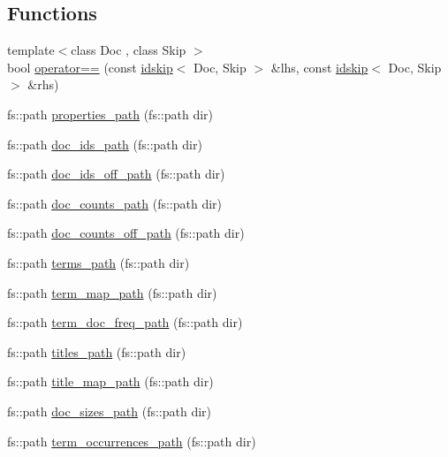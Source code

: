 \subsection*{Functions}
\begin{DoxyCompactItemize}
\item 
{\footnotesize template$<$class Doc , class Skip $>$ }\\bool \mbox{\hyperlink{namespaceirk_1_1index_abd8c6907b919343282e10fd76dec4dba}{operator==}} (const \mbox{\hyperlink{structirk_1_1index_1_1idskip}{idskip}}$<$ Doc, Skip $>$ \&lhs, const \mbox{\hyperlink{structirk_1_1index_1_1idskip}{idskip}}$<$ Doc, Skip $>$ \&rhs)
\item 
fs\+::path \mbox{\hyperlink{namespaceirk_1_1index_a5880f03dd72d6ebbae004d2ab83c219e}{properties\+\_\+path}} (fs\+::path dir)
\item 
fs\+::path \mbox{\hyperlink{namespaceirk_1_1index_a1680416c227181a5ab2f0b0169adb11e}{doc\+\_\+ids\+\_\+path}} (fs\+::path dir)
\item 
fs\+::path \mbox{\hyperlink{namespaceirk_1_1index_aae22e4280b8fc44a46c81159429bf889}{doc\+\_\+ids\+\_\+off\+\_\+path}} (fs\+::path dir)
\item 
fs\+::path \mbox{\hyperlink{namespaceirk_1_1index_aee9cb8e5de7bc61fdc17458d5b597e04}{doc\+\_\+counts\+\_\+path}} (fs\+::path dir)
\item 
fs\+::path \mbox{\hyperlink{namespaceirk_1_1index_a5f8f21506f18df93a60b7ff061a800df}{doc\+\_\+counts\+\_\+off\+\_\+path}} (fs\+::path dir)
\item 
fs\+::path \mbox{\hyperlink{namespaceirk_1_1index_a003bce4c8d885ec3e8ffffd7dc53222f}{terms\+\_\+path}} (fs\+::path dir)
\item 
fs\+::path \mbox{\hyperlink{namespaceirk_1_1index_aa8e9c3cb825736431f0f63ca2b380da3}{term\+\_\+map\+\_\+path}} (fs\+::path dir)
\item 
fs\+::path \mbox{\hyperlink{namespaceirk_1_1index_a616162aee34d0fe0460174bab4e8e518}{term\+\_\+doc\+\_\+freq\+\_\+path}} (fs\+::path dir)
\item 
fs\+::path \mbox{\hyperlink{namespaceirk_1_1index_a2c4aa814da3f9412179fe44a70fdbe94}{titles\+\_\+path}} (fs\+::path dir)
\item 
fs\+::path \mbox{\hyperlink{namespaceirk_1_1index_a276ffa432d29c350840382f2aff86479}{title\+\_\+map\+\_\+path}} (fs\+::path dir)
\item 
fs\+::path \mbox{\hyperlink{namespaceirk_1_1index_a823e8c1206224466802b3cee4c138c8a}{doc\+\_\+sizes\+\_\+path}} (fs\+::path dir)
\item 
fs\+::path \mbox{\hyperlink{namespaceirk_1_1index_a1cd8d96d17fa744fdcc7cb3321b4dd25}{term\+\_\+occurrences\+\_\+path}} (fs\+::path dir)
\end{DoxyCompactItemize}


